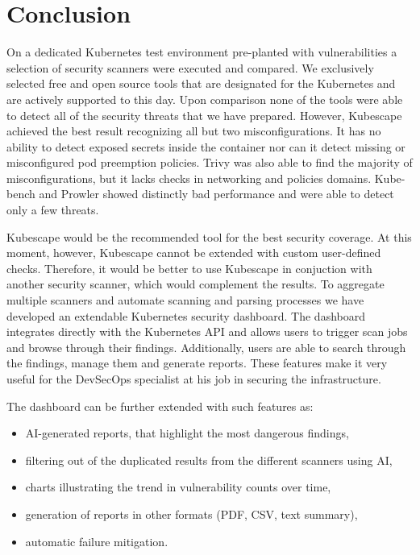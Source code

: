 \chapter*{Conclusion}
\label{chap:conclusion}

On a dedicated Kubernetes test environment pre-planted with vulnerabilities a selection of security scanners were executed and compared. We exclusively selected free and open source tools that are designated for the Kubernetes and are actively supported to this day. Upon comparison none of the tools were able to detect all of the security threats that we have prepared. However, Kubescape achieved the best result recognizing all but two misconfigurations. It has no ability to detect exposed secrets inside the container nor can it detect missing or misconfigured pod preemption policies. Trivy was also able to find the majority of misconfigurations, but it lacks checks in networking and policies domains. Kube-bench and Prowler showed distinctly bad performance and were able to detect only a few threats.

Kubescape would be the recommended tool for the best security coverage. At this moment, however, Kubescape cannot be extended with custom user-defined checks. Therefore, it would be better to use Kubescape in conjuction with another security scanner, which would complement the results. To aggregate multiple scanners and automate scanning and parsing processes we have developed an extendable Kubernetes security dashboard. The dashboard integrates directly with the Kubernetes API and allows users to trigger scan jobs and browse through their findings. Additionally, users are able to search through the findings, manage them and generate reports. These features make it very useful for the DevSecOps specialist at his job in securing the infrastructure.

The dashboard can be further extended with such features as:
\begin{itemize}[noitemsep,nosep]
    \item AI-generated reports, that highlight the most dangerous findings,
    \item filtering out of the duplicated results from the different scanners using AI,
    \item charts illustrating the trend in vulnerability counts over time,
    \item generation of reports in other formats (PDF, CSV, text summary),
    \item automatic failure mitigation.
\end{itemize}